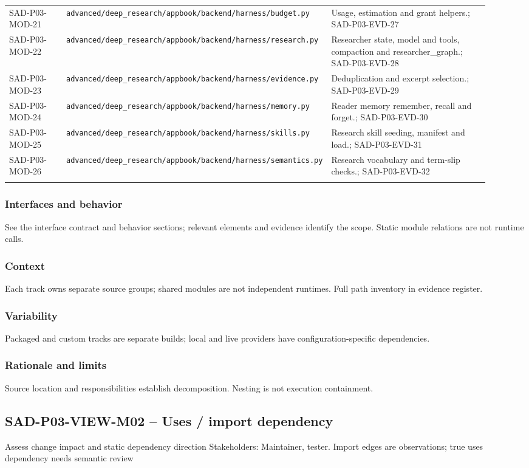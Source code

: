 \documentclass[10pt,letterpaper]{article}
\begin{document}
\begin{longtable}{@{}>{\raggedright\arraybackslash}p{0.15\linewidth}>{\raggedright\arraybackslash}p{0.34\linewidth}>{\raggedright\arraybackslash}p{0.43\linewidth}@{}}
SAD-P03-MOD-21 & \nolinkurl{advanced/deep_research/appbook/backend/harness/budget.py} & Usage, estimation and grant helpers.; SAD-P03-EVD-27\\\addlinespace
SAD-P03-MOD-22 & \nolinkurl{advanced/deep_research/appbook/backend/harness/research.py} & Researcher state, model and tools, compaction and researcher\_graph.; SAD-P03-EVD-28\\\addlinespace
SAD-P03-MOD-23 & \nolinkurl{advanced/deep_research/appbook/backend/harness/evidence.py} & Deduplication and excerpt selection.; SAD-P03-EVD-29\\\addlinespace
SAD-P03-MOD-24 & \nolinkurl{advanced/deep_research/appbook/backend/harness/memory.py} & Reader memory remember, recall and forget.; SAD-P03-EVD-30\\\addlinespace
SAD-P03-MOD-25 & \nolinkurl{advanced/deep_research/appbook/backend/harness/skills.py} & Research skill seeding, manifest and load.; SAD-P03-EVD-31\\\addlinespace
SAD-P03-MOD-26 & \nolinkurl{advanced/deep_research/appbook/backend/harness/semantics.py} & Research vocabulary and term-slip checks.; SAD-P03-EVD-32\\\addlinespace
\bottomrule\end{longtable}

\subsubsection{Interfaces and behavior}
See the interface contract and behavior sections; relevant elements and evidence identify the scope. Static module relations are not runtime calls.
\subsubsection{Context}
Each track owns separate source groups; shared modules are not independent runtimes. Full path inventory in evidence register.
\subsubsection{Variability}
Packaged and custom tracks are separate builds; local and live providers have configuration-specific dependencies.
\subsubsection{Rationale and limits}
Source location and responsibilities establish decomposition. Nesting is not execution containment.
\subsection{SAD-P03-VIEW-M02 -- Uses / import dependency}
Assess change impact and static dependency direction Stakeholders: Maintainer, tester. Import edges are observations; true uses dependency needs semantic review
\end{document}
